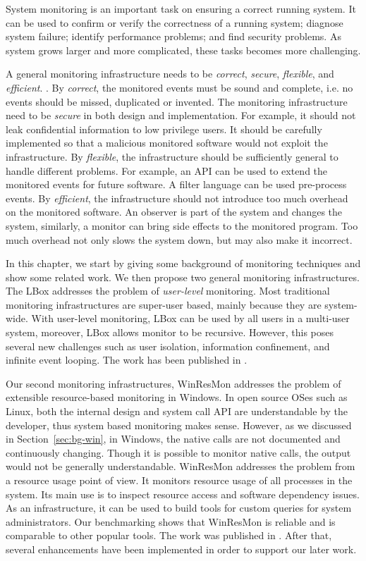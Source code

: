 System monitoring is an important task on ensuring a correct running
system.
It can be used to confirm or verify the correctness of a running system;
diagnose system failure;
identify performance problems;
and find security problems.
As system grows larger and more complicated, these tasks becomes more challenging.

A general monitoring infrastructure needs to be
{\em correct}, {\em secure}, {\em flexible}, and {\em efficient}.
.
By {\em correct}, the monitored events must be sound and complete, i.e.
no events should be missed, duplicated or invented.
The monitoring infrastructure need to be {\em secure} in both design and implementation.
For example, it should not leak confidential information to low privilege users.
It should be carefully implemented so that a malicious monitored
software would not exploit the infrastructure.
By {\em flexible}, the infrastructure should be sufficiently general to
handle different problems.
For example, an API can be used to extend the monitored events for future software.
A filter language can be used pre-process events.
By {\em efficient}, the infrastructure should not introduce too much
overhead on the monitored software.
An observer is part of the system and changes the system, similarly,
a monitor can bring side effects to the monitored program.
Too much overhead not only slows the system down, but may also make
it incorrect.

In this chapter, we start by giving some background of monitoring techniques
and show some related work.
We then propose two general monitoring infrastructures.
The LBox addresses the problem of {\em user-level} monitoring.
Most traditional monitoring infrastructures are super-user based,
mainly because they are system-wide.
With user-level monitoring, LBox can be used by all users in a multi-user
system, moreover, LBox allows monitor to be recursive.
However, this poses several new challenges such as
user isolation, information confinement, and infinite event looping.
The work has been published in \cite{wu2005user}.

Our second monitoring infrastructures, WinResMon addresses the problem
of extensible resource-based monitoring in Windows.
In open source OSes such as Linux,
both the internal design and system call API are understandable by
the developer, thus system based monitoring makes sense.
However, as we discussed in Section~\ref{sec:bg-win},
in Windows, the native calls are not documented and continuously
changing.
Though it is possible to monitor native calls, the output would not be
generally understandable.
WinResMon addresses the problem from a resource usage point of view.
It monitors resource usage of all processes in the system.
Its main use is to inspect resource access and software dependency issues.
As an infrastructure, it can be used to build tools for custom queries
for system administrators.
Our benchmarking shows that WinResMon is reliable and is
comparable to other popular tools.
The work was published in \cite{ramnath2006winresmon}.
After that, several enhancements have been implemented in order to support
our later work.
